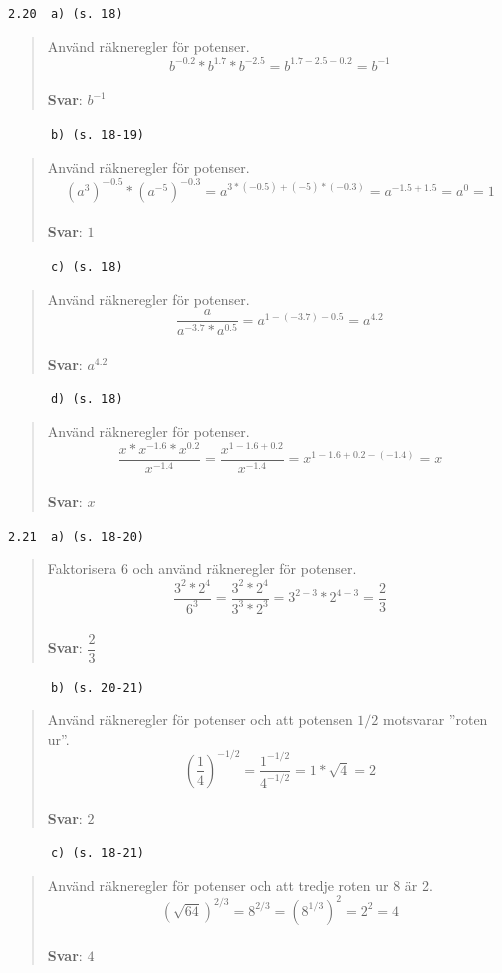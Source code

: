 \documentclass[a4paper]{article}
\newcommand{\tskcol}[1]{\textcolor{tskcol}{#1}}
\begin{document}
	\texttt{\tskcol{2.20~~a) (s. 18)}}
	\begin{quotation}
		\noindent
		Använd räkneregler för potenser.
		\[b^{-0.2}*b^{1.7}*b^{-2.5}=b^{1.7-2.5-0.2}=b^{-1}\]
		\\
		\textbf{Svar}: $b^{-1}$
	\end{quotation}
	
	\texttt{\tskcol{~~~~~~b) (s. 18-19)}}
	\begin{quotation}
		\noindent
		Använd räkneregler för potenser.
		\[(a^3)^{-0.5}*(a^{-5})^{-0.3}=
		a^{3*(-0.5)+(-5)*(-0.3)}=
		a^{-1.5+1.5}=
		a^0=
		1\]
		\\
		\textbf{Svar}: $1$
	\end{quotation}
	
	\texttt{\tskcol{~~~~~~c) (s. 18)}}
	\begin{quotation}
		\noindent
		Använd räkneregler för potenser.
		\[\dfrac{a}{a^{-3.7}*a^{0.5}}=a^{1-(-3.7)-0.5}=a^{4.2}\]
		\\
		\textbf{Svar}: $a^{4.2}$
	\end{quotation}
	
	\texttt{\tskcol{~~~~~~d) (s. 18)}}
	\begin{quotation}
		\noindent
		Använd räkneregler för potenser.
		\[\dfrac{x*x^{-1.6}*x^{0.2}}{x^{-1.4}}=
		\dfrac{x^{1-1.6+0.2}}{x^{-1.4}}=
		x^{1-1.6+0.2-(-1.4)}=
		x\]
		\\
		\textbf{Svar}: $x$
	\end{quotation}
	
	\texttt{\tskcol{2.21~~a) (s. 18-20)}}
	\begin{quotation}
		\noindent
		Faktorisera $6$ och använd räkneregler för potenser.
		\[\dfrac{3^2*2^4}{6^3}=
		\dfrac{3^2*2^4}{3^3*2^3}=
		3^{2-3}*2^{4-3}=
		\dfrac{2}{3}\]
		\\
		\textbf{Svar}: $\dfrac{2}{3}$
	\end{quotation}
	
	\texttt{\tskcol{~~~~~~b) (s. 20-21)}}
	\begin{quotation}
		\noindent
		Använd räkneregler för potenser och att potensen $1/2$ motsvarar ''roten ur''.
		\[\left(\dfrac{1}{4}\right)^{-1/2}=
		\dfrac{1^{-1/2}}{4^{-1/2}}=
		1*\sqrt{4}=
		2\]
		\\
		\textbf{Svar}: $2$
	\end{quotation}
	
	\texttt{\tskcol{~~~~~~c) (s. 18-21)}}
	\begin{quotation}
		\noindent
		Använd räkneregler för potenser och att tredje roten ur 8 är 2.
		\[(\sqrt{64})^{2/3}=
		8^{2/3}=
		(8^{1/3})^2=
		2^2=
		4\]
		\\
		\textbf{Svar}: $4$
	\end{quotation}
	
\end{document}
